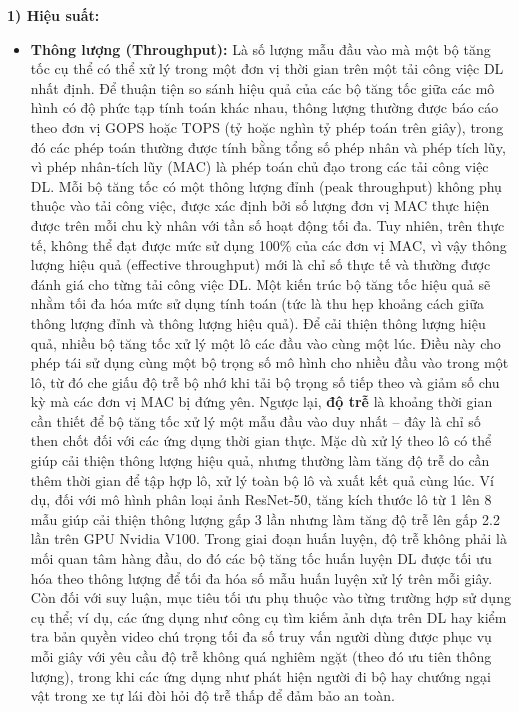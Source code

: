 \documentclass[a4paper]{article}
\begin{document}
\textbf{1) Hiệu suất:}

\begin{itemize}
    \item \textbf{Thông lượng (Throughput):} Là số lượng mẫu đầu vào mà một bộ tăng tốc cụ thể có thể xử lý trong một đơn vị thời gian trên một tải công việc DL nhất định. Để thuận tiện so sánh hiệu quả của các bộ tăng tốc giữa các mô hình có độ phức tạp tính toán khác nhau, thông lượng thường được báo cáo theo đơn vị GOPS hoặc TOPS (tỷ hoặc nghìn tỷ phép toán trên giây), trong đó các phép toán thường được tính bằng tổng số phép nhân và phép tích lũy, vì phép nhân-tích lũy (MAC) là phép toán chủ đạo trong các tải công việc DL. Mỗi bộ tăng tốc có một thông lượng đỉnh (peak throughput) không phụ thuộc vào tải công việc, được xác định bởi số lượng đơn vị MAC thực hiện được trên mỗi chu kỳ nhân với tần số hoạt động tối đa. Tuy nhiên, trên thực tế, không thể đạt được mức sử dụng 100\% của các đơn vị MAC, vì vậy thông lượng hiệu quả (effective throughput) mới là chỉ số thực tế và thường được đánh giá cho từng tải công việc DL. Một kiến trúc bộ tăng tốc hiệu quả sẽ nhằm tối đa hóa mức sử dụng tính toán (tức là thu hẹp khoảng cách giữa thông lượng đỉnh và thông lượng hiệu quả). Để cải thiện thông lượng hiệu quả, nhiều bộ tăng tốc xử lý một lô các đầu vào cùng một lúc. Điều này cho phép tái sử dụng cùng một bộ trọng số mô hình cho nhiều đầu vào trong một lô, từ đó che giấu độ trễ bộ nhớ khi tải bộ trọng số tiếp theo và giảm số chu kỳ mà các đơn vị MAC bị đứng yên. Ngược lại, \textbf{độ trễ} là khoảng thời gian cần thiết để bộ tăng tốc xử lý một mẫu đầu vào duy nhất – đây là chỉ số then chốt đối với các ứng dụng thời gian thực. Mặc dù xử lý theo lô có thể giúp cải thiện thông lượng hiệu quả, nhưng thường làm tăng độ trễ do cần thêm thời gian để tập hợp lô, xử lý toàn bộ lô và xuất kết quả cùng lúc. Ví dụ, đối với mô hình phân loại ảnh ResNet-50, tăng kích thước lô từ 1 lên 8 mẫu giúp cải thiện thông lượng gấp 3 lần nhưng làm tăng độ trễ lên gấp 2.2 lần trên GPU Nvidia V100. Trong giai đoạn huấn luyện, độ trễ không phải là mối quan tâm hàng đầu, do đó các bộ tăng tốc huấn luyện DL được tối ưu hóa theo thông lượng để tối đa hóa số mẫu huấn luyện xử lý trên mỗi giây. Còn đối với suy luận, mục tiêu tối ưu phụ thuộc vào từng trường hợp sử dụng cụ thể; ví dụ, các ứng dụng như công cụ tìm kiếm ảnh dựa trên DL hay kiểm tra bản quyền video chú trọng tối đa số truy vấn người dùng được phục vụ mỗi giây với yêu cầu độ trễ không quá nghiêm ngặt (theo đó ưu tiên thông lượng), trong khi các ứng dụng như phát hiện người đi bộ hay chướng ngại vật trong xe tự lái đòi hỏi độ trễ thấp để đảm bảo an toàn.
\end{itemize}
\end{document}
